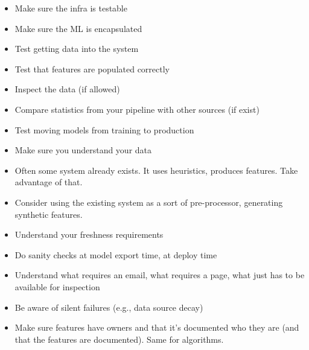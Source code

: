 
\begin{itemize}
\item Make sure the infra is testable
\item Make sure the ML is encapsulated
\item Test getting data into the system
\item Test that features are populated correctly
\item Inspect the data (if allowed)
\item Compare statistics from your pipeline with other sources (if
  exist)
\item Test moving models from training to production
\item Make sure you understand your data
\end{itemize}


\begin{itemize}
\item Often some system already exists.  It uses heuristics, produces
  features.  Take advantage of that.
\item Consider using the existing system as a sort of pre-processor,
  generating synthetic features.
\end{itemize}


\begin{itemize}
\item Understand your freshness requirements
\item Do sanity checks at model export time, at deploy time
\item Understand what requires an email, what requires a page, what
  just has to be available for inspection
\item Be aware of silent failures (e.g., data source decay)
\item Make sure features have owners and that it's documented who they
  are (and that the features are documented).  Same for algorithms.
\end{itemize}



